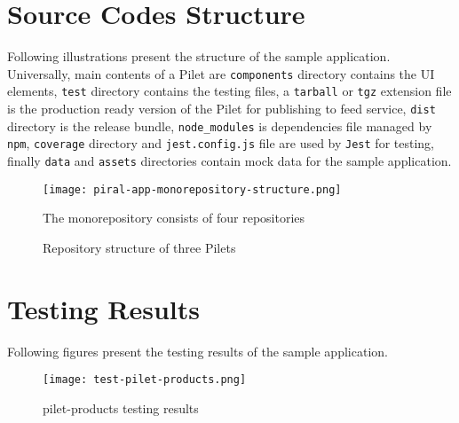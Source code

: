 \documentclass[a4paper]{book}
\begin{document}
{}

\begin{appendix}
\chapter{Source Codes Structure}
Following illustrations present the structure of the sample application. Universally, main contents of a Pilet are \verb|components| directory contains the UI elements, \verb|test| directory contains the testing files, a \verb|tarball| or \verb|tgz| extension file is the production ready version of the Pilet for publishing to feed service, \verb|dist| directory is the release bundle, \verb|node_modules| is dependencies file managed by \verb|npm|, \verb|coverage| directory and \verb|jest.config.js| file are used by \verb|Jest| for testing, finally \verb|data| and \verb|assets| directories contain mock data for the sample application.

\begin{figure}[h!]
  \centering
  \captionsetup{justification=centering}
  \texttt{[image: piral-app-monorepository-structure.png]}
  \caption{The monorepository consists of four repositories}
  \label{fig:1}
\end{figure}

\begin{figure}[h!]
    \centering
    \captionsetup{justification=centering}
    \hspace*{0.1\hsize}
    \hspace*{0.1\hsize}
    \caption{Repository structure of three Pilets}
    \label{fig:monorepositroy}
\end{figure}

\chapter{Testing Results}  %

Following figures present the testing results of the sample application.

\begin{figure}[h!]
    \centering
    \captionsetup{justification=centering}
    \caption{pilet-products testing results}
    {\texttt{[image: test-pilet-products.png]}}
\end{figure}


\end{appendix}
\end{document}
